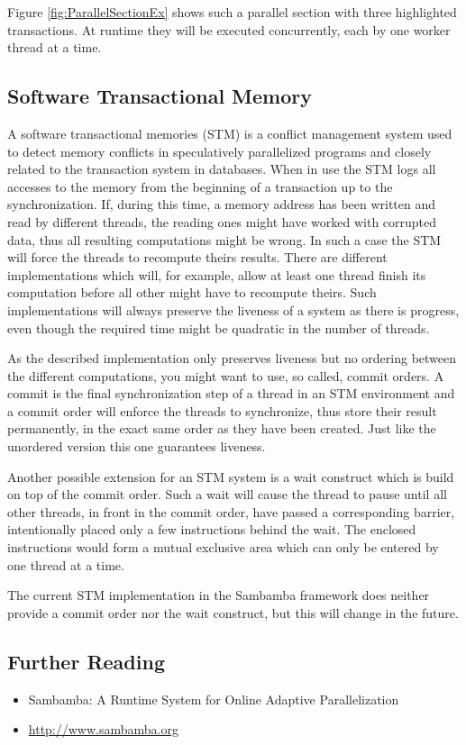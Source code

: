 Figure \ref{fig:ParallelSectionEx} shows such a parallel section with three 
highlighted transactions. At runtime they will be executed concurrently, each 
by one worker thread at a time.
\\

\subsection{Software Transactional Memory}
A software transactional memories (STM) is a conflict management system used to detect
memory conflicts in speculatively parallelized programs and closely related to
the transaction system in databases. When in use the STM logs
all accesses to the memory from the beginning of a transaction up to the 
synchronization. If, during this time, a memory address has been written and 
read by different threads, the reading ones might have worked with
corrupted data, thus all resulting computations might be wrong. In such a case
the STM will force the threads to recompute theirs results. There are different
implementations which will, for example, allow at least one thread finish its
computation before all other might have to recompute theirs. Such implementations 
will always preserve the liveness of a system as there is progress, even though
the required time might be quadratic in the number of threads.

As the described implementation only preserves liveness but no ordering between
the different computations, you might want to use, so called, commit orders. 
A commit is the final synchronization step of a thread in an STM environment and
a commit order will enforce the threads to synchronize, thus store their result
permanently, in the exact same order as they have been created. Just like the 
unordered version this one guarantees liveness.

Another possible extension for an STM system is a wait construct which is build
on top of the commit order. Such a wait will cause the thread to pause until 
all other threads, in front in the commit order, have passed a corresponding 
barrier, intentionally placed only a few instructions behind the wait. The 
enclosed instructions would form a mutual exclusive area which can only be 
entered by one thread at a time. 


The current STM implementation in the Sambamba framework does neither provide a 
commit order nor the wait construct, but this will change in the future.

\subsection*{Further Reading}
\begin{itemize}
  \item Sambamba: A Runtime System for Online Adaptive Parallelization \cite{DBLP:conf/cc/StreitHZH12}  
  \item \url{http://www.sambamba.org} \nocite{StreitHZH12:Online}
\end{itemize}



